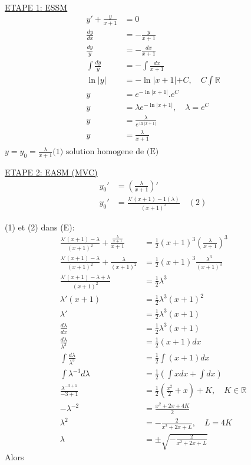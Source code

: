 \underline{ETAPE 1: ESSM}
\begin{align*}
	y' + \frac{y}{x+1} &= 0 \\
	\frac{dy}{dx} &= -\frac{y}{x+1} \\
	\frac{dy}{y} &= -\frac{dx}{x+1} \\
	\int \frac{dy}{y} &= - \int \frac{dx}{x+1} \\	
	\ln \lvert y \lvert &= - \ln \lvert x + 1 \lvert + C, \quad C \int \mathbb{R} \\
	y &= e^{-\ln |x+1|}	. e^{C} \\
	y &= \lambda e^{-\ln |x+1|} , \quad \lambda = e^C \\
	y &= \frac{\lambda}{e^{\ln |x+1|}} \\
	y &= \frac{\lambda}{x+1} \\
\end{align*}
$y = y_0 = \frac{\lambda}{x+1} \text{(1) solution homogene de (E)}$

\underline{ETAPE 2: EASM (MVC)}
\begin{align*}
	y_0' &= (\frac{\lambda}{x+1})' \\
	y_0' &= \frac{\lambda' (x+1) - 1 (\lambda)}{(x+1)^2} \quad (2)
\end{align*}

(1) et (2) dans (E):
\begin{align*}
	\frac{\lambda' (x+1) - \lambda}{(x+1)^2} + \frac{\frac{\lambda}{x+1}}{x+1} &= \frac{1}{2} (x + 1)^3 (\frac{\lambda}{x+1})^3 \\
	\frac{\lambda' (x+1) - \lambda}{(x+1)^2} + \frac{\lambda}{(x+1)^2} &= \frac{1}{2} (x + 1)^3 \frac{\lambda^3}{(x+1)^3} \\
	\frac{\lambda' (x+1) - \lambda + \lambda}{(x+1)^2} &= \frac{1}{2}{\lambda^3} \\
	\lambda' (x+1)  &= \frac{1}{2}{\lambda^3} (x+1)^2 \\
	\lambda' &= \frac{1}{2}{\lambda^3} (x+1) \\
	\frac{d\lambda}{dx} &= \frac{1}{2}{\lambda^3} (x+1) \\
	\frac{d\lambda}{\lambda^3} &= \frac{1}{2} (x+1) {dx}\\
	\int \frac{d\lambda}{\lambda^3} &= \frac{1}{2} \int (x+1) {dx}\\
	\int {\lambda^{-3}}{d\lambda} &= \frac{1}{2} (\int x {dx} + \int{dx}) \\
	\frac{\lambda^{-3+1}}{-3+1} &= \frac{1}{2} (\frac{x^2}{2} + x) + K, \quad K \in \mathbb{R} \\
	- \lambda^{-2} &= \frac{x^2 + 2x + 4K}{2}  \\
	\lambda^{2} &= -\frac{2}{x^2 + 2x + L}, \quad L = 4K \\
	\lambda &= \pm \sqrt{-\frac{2}{x^2 + 2x + L}}
\end{align*}
Alors

